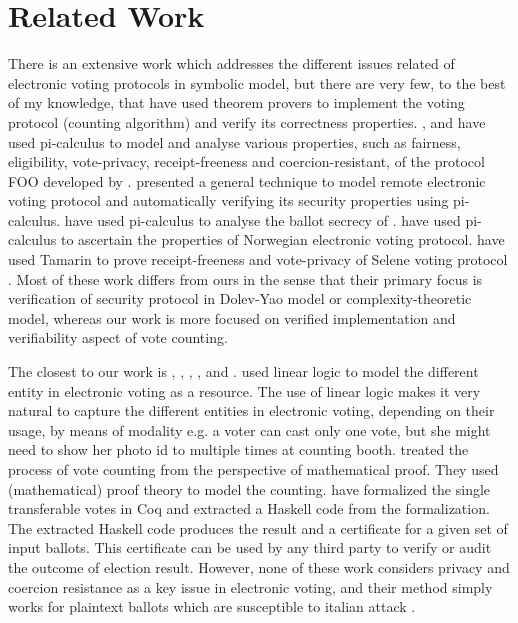 \section{Related Work}
 There is an extensive work which 
 addresses the different issues related of electronic voting protocols  in symbolic model, 
 but there are very few, to the best of my knowledge, 
 that have used theorem provers to implement the voting protocol (counting algorithm)
 and verify its correctness properties. 
 \citep{10.1007/978-3-540-31987-0_14}, and  \citep{Delaune2010} have used pi-calculus to model 
 and analyse various properties, such as fairness, eligibility, vote-privacy, receipt-freeness and 
 coercion-resistant,  
 of the protocol FOO developed by \citep{10.1007/3-540-57220-1_66}.  \citep{Backes:2008:AVR:1380848.1381255}
 presented a general technique to model  remote electronic 
 voting protocol and automatically verifying  its security properties using pi-calculus. 
 \citep{5992139} have used pi-calculus to analyse the ballot secrecy of \citep{Helios:2016:HVS}.
 \citep{10.1007/978-3-642-28641-4_7} have used pi-calculus to ascertain the properties of 
 Norwegian electronic voting protocol.
 \citep{10.1007/978-3-319-68687-5_7} have used Tamarin  to prove receipt-freeness 
 and vote-privacy of Selene voting protocol \citep{Selene}.  Most of these work differs from ours
 in the sense that their primary focus is verification of security protocol in  
 Dolev-Yao model or  complexity-theoretic model, whereas our work is 
 more focused on verified implementation and  verifiability  aspect of vote counting.

 The closest to our work is \citep{DeYoung:2012:LLV}, \citep{Pattinson:2015:VCM}, \citep{Pattinson:2016:MSP},
 \citep{Verity:2017:FVI:3014812.3014845}, and \citep{Ghale:2017:FVS}.  \citep{DeYoung:2012:LLV} 
 used linear logic \citep{GIRARD19871} to model the different entity in electronic voting as a resource. 
 The use of linear logic makes it very natural to capture the different entities in electronic voting,  
 depending on their usage, by means of modality e.g. a voter can cast only one vote, but she might 
 need to show her photo id to multiple times at counting booth. \citep{Pattinson:2015:VCM} treated 
 the process of vote counting from
 the perspective of mathematical proof. They used (mathematical) proof theory to model the 
 counting. \citep{Ghale:2017:FVS} have formalized the single transferable votes in Coq and 
 extracted a Haskell code from the formalization. The extracted Haskell code produces the result 
 and a certificate for a given set of input ballots. This certificate can be used by any third party to verify 
 or audit the outcome of election result.  However, none of these work considers privacy and coercion resistance as a key 
 issue in electronic voting, and their method simply works for plaintext ballots which are  susceptible to 
 italian attack  \citep{Otten}   \citep{Benaloh:2009:SSC}.


